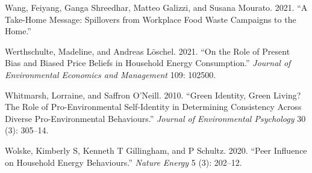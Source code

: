 \documentclass[
  11pt,
  captions=heading]{scrreport}
\newlength{\cslhangindent}
\newlength{\cslentryspacingunit} %
\newenvironment{CSLReferences}[2] %
 {%
  \setlength{\parindent}{0pt}
  \ifodd #1
  \let\oldpar\par
  \def\par{\hangindent=\cslhangindent\oldpar}
  \fi
  \setlength{\parskip}{#2\cslentryspacingunit}
 }%
 {}
\begin{document}
\begin{CSLReferences}{1}{0}
\leavevmode{}%
Wang, Feiyang, Ganga Shreedhar, Matteo Galizzi, and Susana Mourato.
2021. {``A Take-Home Message: Spillovers from Workplace Food Waste
Campaigns to the Home.''}

\leavevmode{}%
Werthschulte, Madeline, and Andreas Löschel. 2021. {``On the Role of
Present Bias and Biased Price Beliefs in Household Energy
Consumption.''} \emph{Journal of Environmental Economics and Management}
109: 102500.

\leavevmode{}%
Whitmarsh, Lorraine, and Saffron O'Neill. 2010. {``Green Identity, Green
Living? The Role of Pro-Environmental Self-Identity in Determining
Consistency Across Diverse Pro-Environmental Behaviours.''}
\emph{Journal of Environmental Psychology} 30 (3): 305--14.

\leavevmode{}%
Wolske, Kimberly S, Kenneth T Gillingham, and P Schultz. 2020. {``Peer
Influence on Household Energy Behaviours.''} \emph{Nature Energy} 5 (3):
202--12.

\end{CSLReferences}
\end{document}
